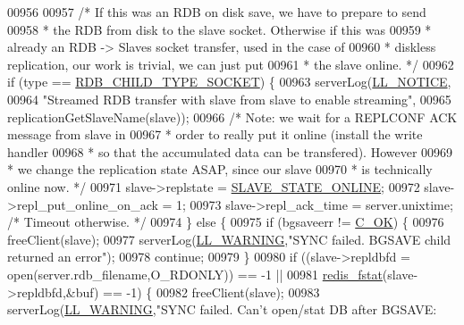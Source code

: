 \begin{DoxyCode}
{{{{{{{{{{{{{{{{{{{{{{{{{{{{{{{{{{{{{00956 
00957             \textcolor{comment}{/* If this was an RDB on disk save, we have to prepare to send}
00958 \textcolor{comment}{             * the RDB from disk to the slave socket. Otherwise if this was}
00959 \textcolor{comment}{             * already an RDB -> Slaves socket transfer, used in the case of}
00960 \textcolor{comment}{             * diskless replication, our work is trivial, we can just put}
00961 \textcolor{comment}{             * the slave online. */}
00962             \textcolor{keywordflow}{if} (type == \hyperlink{server_8h_acdbf61346e1d2f54716e2ab6fe73e954}{RDB\_CHILD\_TYPE\_SOCKET}) \{
00963                 serverLog(\hyperlink{server_8h_a8c54c191e436c7dd3012167212692401}{LL\_NOTICE},
00964                     \textcolor{stringliteral}{"Streamed RDB transfer with slave %
       from slave to enable streaming"},
00965                         replicationGetSlaveName(slave));
00966                 \textcolor{comment}{/* Note: we wait for a REPLCONF ACK message from slave in}
00967 \textcolor{comment}{                 * order to really put it online (install the write handler}
00968 \textcolor{comment}{                 * so that the accumulated data can be transfered). However}
00969 \textcolor{comment}{                 * we change the replication state ASAP, since our slave}
00970 \textcolor{comment}{                 * is technically online now. */}
00971                 slave->replstate = \hyperlink{server_8h_ad895fdf16e5ed5275d19ddf8578b900f}{SLAVE\_STATE\_ONLINE};
00972                 slave->repl\_put\_online\_on\_ack = 1;
00973                 slave->repl\_ack\_time = server.unixtime; \textcolor{comment}{/* Timeout otherwise. */}
00974             \} \textcolor{keywordflow}{else} \{
00975                 \textcolor{keywordflow}{if} (bgsaveerr != \hyperlink{server_8h_a303769ef1065076e68731584e758d3e1}{C\_OK}) \{
00976                     freeClient(slave);
00977                     serverLog(\hyperlink{server_8h_a31229b9334bba7d6be2a72970967a14b}{LL\_WARNING},\textcolor{stringliteral}{"SYNC failed. BGSAVE child returned an error"});
00978                     \textcolor{keywordflow}{continue};
00979                 \}
00980                 \textcolor{keywordflow}{if} ((slave->repldbfd = open(server.rdb\_filename,O\_RDONLY)) == -1 ||
00981                     \hyperlink{config_8h_a7fb7329d05a6b4d1b1e7a3fac44c0668}{redis\_fstat}(slave->repldbfd,&buf) == -1) \{
00982                     freeClient(slave);
00983                     serverLog(\hyperlink{server_8h_a31229b9334bba7d6be2a72970967a14b}{LL\_WARNING},\textcolor{stringliteral}{"SYNC failed. Can't open/stat DB after BGSAVE: %
}}}}}}}}}}}}}}}}}}}}}}}}}}}}}}}}}}}}}}
\end{DoxyCode}
